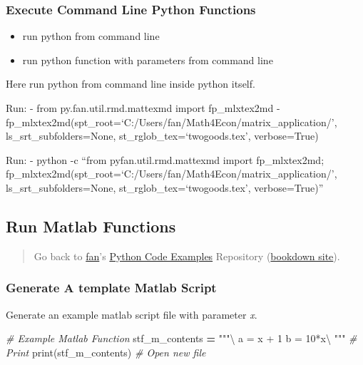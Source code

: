 \documentclass[
]{book}
\newenvironment{Shaded}{\begin{snugshade}}{\end{snugshade}}
\newcommand{\BuiltInTok}[1]{#1}
\newcommand{\CommentTok}[1]{\textcolor[rgb]{0.56,0.35,0.01}{\textit{#1}}}
\newcommand{\NormalTok}[1]{#1}
\newcommand{\OperatorTok}[1]{\textcolor[rgb]{0.81,0.36,0.00}{\textbf{#1}}}
\newcommand{\StringTok}[1]{\textcolor[rgb]{0.31,0.60,0.02}{#1}}
\providecommand{\tightlist}{%
  \setlength{\itemsep}{0pt}\setlength{\parskip}{0pt}}
\begin{document}
\hypertarget{execute-command-line-python-functions}{%
\subsubsection{Execute Command Line Python Functions}\label{execute-command-line-python-functions}}

\begin{itemize}
\tightlist
\item
  run python from command line
\item
  run python function with parameters from command line
\end{itemize}

Here run python from command line inside python itself.

Run:
- from py.fan.util.rmd.mattexmd import fp\_mlxtex2md
- fp\_mlxtex2md(spt\_root=`C:/Users/fan/Math4Econ/matrix\_application/', ls\_srt\_subfolders=None, st\_rglob\_tex=`twogoods.tex', verbose=True)

Run:
- python -c ``from pyfan.util.rmd.mattexmd import fp\_mlxtex2md; fp\_mlxtex2md(spt\_root=`C:/Users/fan/Math4Econ/matrix\_application/', ls\_srt\_subfolders=None, st\_rglob\_tex=`twogoods.tex', verbose=True)''

\hypertarget{run-matlab-functions}{%
\subsection{Run Matlab Functions}\label{run-matlab-functions}}

\begin{quote}
Go back to \href{http://fanwangecon.github.io/}{fan}'s \href{https://fanwangecon.github.io/pyfan/}{Python Code Examples} Repository (\href{https://fanwangecon.github.io/pyfan/bookdown}{bookdown site}).
\end{quote}

\hypertarget{generate-a-template-matlab-script}{%
\subsubsection{Generate A template Matlab Script}\label{generate-a-template-matlab-script}}

Generate an example matlab script file with parameter \emph{x}.

\begin{Shaded}
\begin{Highlighting}[]
\CommentTok{# Example Matlab Function}
\NormalTok{stf_m_contents }\OperatorTok{=} \StringTok{"""\textbackslash{}}
\StringTok{a = x + 1}
\StringTok{b = 10*x\textbackslash{}}
\StringTok{"""}
\CommentTok{# Print}
\BuiltInTok{print}\NormalTok{(stf_m_contents)}
\CommentTok{# Open new file}
\end{Highlighting}
\end{Shaded}
\end{document}
